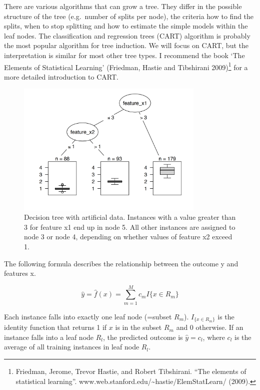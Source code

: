 \documentclass[
  10pt,
]{scrbook}
\begin{document}
There are various algorithms that can grow a tree.
They differ in the possible structure of the tree (e.g.~number of splits per node), the criteria how to find the splits, when to stop splitting and how to estimate the simple models within the leaf nodes.
The classification and regression trees (CART) algorithm is probably the most popular algorithm for tree induction.
We will focus on CART, but the interpretation is similar for most other tree types.
I recommend the book `The Elements of Statistical Learning' (Friedman, Hastie and Tibshirani 2009)\footnote{Friedman, Jerome, Trevor Hastie, and Robert Tibshirani. ``The elements of statistical learning''. www.web.stanford.edu/\textasciitilde hastie/ElemStatLearn/ (2009).} for a more detailed introduction to CART.

\begin{figure}

{\centering \includegraphics[width=0.8\textwidth]{images/tree-artificial-1} 

}

\caption{Decision tree with artificial data. Instances with a value greater than 3 for feature x1 end up in node 5. All other instances are assigned to node 3 or node 4, depending on whether values of feature x2  exceed 1.}\label{fig:tree-artificial}
\end{figure}

The following formula describes the relationship between the outcome y and features x.

\[\hat{y}=\hat{f}(x)=\sum_{m=1}^Mc_m{}I\{x\in{}R_m\}\]

Each instance falls into exactly one leaf node (=subset \(R_m\)).
\(I_{\{x\in{}R_m\}}\) is the identity function that returns 1 if \(x\) is in the subset \(R_m\) and 0 otherwise.
If an instance falls into a leaf node \(R_l\), the predicted outcome is \(\hat{y}=c_l\), where \(c_l\) is the average of all training instances in leaf node \(R_l\).
\end{document}
